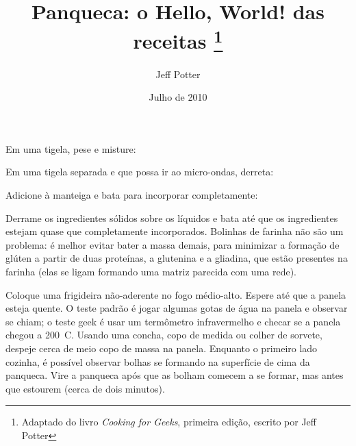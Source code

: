 \documentclass[a4paper,oneside]{article}
\title{Panqueca: o Hello, World! das receitas%
  \footnote{Adaptado do livro \emph{Cooking for Geeks}, primeira edição,
  escrito por Jeff Potter}}
\author{Jeff Potter}
\date{Julho de 2010}
\begin{document}
\frenchspacing

\maketitle

Em uma tigela, pese e misture:


Em uma tigela separada e que possa ir ao micro-ondas, derreta:


Adicione à manteiga e bata para incorporar completamente:


Derrame os ingredientes sólidos sobre os líquidos e bata até que os
ingredientes estejam quase que completamente incorporados. Bolinhas de farinha
não são um problema: é melhor evitar bater a massa demais, para minimizar a
formação de glúten a partir de duas proteínas, a glutenina e a gliadina, que
estão presentes na farinha (elas se ligam formando uma matriz parecida com uma
rede).

Coloque uma frigideira não-aderente no fogo médio-alto. Espere até que a panela
esteja quente. O teste padrão é jogar algumas gotas de água na panela e
observar se chiam; o teste geek é usar um termômetro infravermelho e checar se
a panela chegou a 200~\textdegree C. Usando uma concha, copo de medida ou
colher de sorvete, despeje cerca de meio copo de massa na panela. Enquanto o
primeiro lado cozinha, é possível observar bolhas se formando na superfície de
cima da panqueca. Vire a panqueca após que as bolham comecem a se formar, mas
antes que estourem (cerca de dois minutos).
\end{document}
